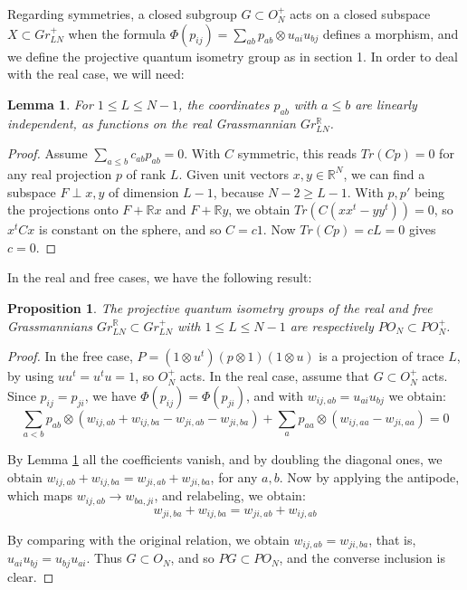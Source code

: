 \documentclass[11pt]{article}
\theoremstyle{plain}
\newtheorem{proposition}[theorem]{Proposition}
\newtheorem{lemma}[theorem]{Lemma}
\begin{document}
\bigskip

Regarding symmetries, a closed subgroup $G\subset O_N^+$ acts on a closed subspace $X\subset Gr^+_{LN}$ when the formula $\Phi(p_{ij})=\sum_{ab}p_{ab}\otimes u_{ai}u_{bj}$ defines a morphism, and we define the projective quantum isometry group as in section 1. In order to deal with the real case, we will need:

\begin{lemma}
\label{lem:indep}
For $1\leq L\leq N-1$, the coordinates $p_{ab}$ with $a\leq b$ are linearly independent, as functions on the real Grassmannian $Gr^\mathbb R_{LN}$.
\end{lemma}

\begin{proof}
Assume $\sum_{a\leq b}c_{ab}p_{ab}=0$. With $C$ symmetric, this reads $Tr(Cp)=0$ for any real projection $p$ of rank $L$. Given unit vectors $x,y\in\mathbb R^N$, we can find a subspace $F\perp x,y$ of dimension $L-1$, because $N-2\geq L-1$. With $p,p'$ being the projections onto $F+\mathbb Rx$ and $F+\mathbb Ry$, we obtain $Tr(C(xx^t-yy^t))=0$, so $x^tCx$ is constant on the sphere, and so $C=c1$. Now $Tr(Cp)=cL=0$ gives $c=0$.
\end{proof}

In the real and free cases, we have the following result:

\begin{proposition}
\label{prop:grassiso}
The projective quantum isometry groups of the real and free Grassmannians $Gr^\mathbb R_{LN}\subset Gr^+_{LN}$ with $1\leq L\leq N-1$ are respectively $PO_N\subset PO_N^+$.
\end{proposition}

\begin{proof}
In the free case, $P=(1\otimes u^t)(p\otimes1)(1\otimes u)$ is a projection of trace $L$, by using $uu^t=u^tu=1$, so $O_N^+$ acts. In the real case, assume that $G\subset O_N^+$ acts. Since $p_{ij}=p_{ji}$, we have $\Phi(p_{ij})=\Phi(p_{ji})$, and with $w_{ij,ab}=u_{ai}u_{bj}$ we obtain:
$$\sum_{a<b}p_{ab}\otimes(w_{ij,ab}+w_{ij,ba}-w_{ji,ab}-w_{ji,ba})+\sum_ap_{aa}\otimes(w_{ij,aa}-w_{ji,aa})=0$$

By Lemma \ref{lem:indep} all the coefficients vanish, and by doubling the diagonal ones, we obtain $w_{ij,ab}+w_{ij,ba}=w_{ji,ab}+w_{ji,ba}$, for any $a,b$. Now by applying the antipode, which maps $w_{ij,ab}\to w_{ba,ji}$, and relabeling, we obtain:
$$w_{ji,ba}+w_{ij,ba}=w_{ji,ab}+w_{ij,ab}$$

By comparing with the original relation, we obtain $w_{ij,ab}=w_{ji,ba}$, that is, $u_{ai}u_{bj}=u_{bj}u_{ai}$. Thus $G\subset O_N$, and so $PG\subset PO_N$, and the converse inclusion is clear.
\end{proof}
\end{document}
